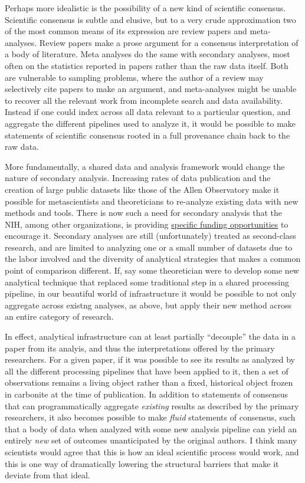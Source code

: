 \documentclass[11pt]{article}
\begin{document}
\begin{multicols}{2}
Perhaps more idealistic is the possibility of a new kind of scientific
consensus. Scientific consensus is subtle and elusive, but to a very
crude approximation two of the most common means of its expression are
review papers and meta-analyses. Review papers make a prose argument for
a consensus interpretation of a body of literature. Meta analyses do the
same with secondary analyses, most often on the statistics reported in
papers rather than the raw data itself. Both are vulnerable to sampling
problems, where the author of a review may selectively cite papers to
make an argument, and meta-analyses might be unable to recover all the
relevant work from incomplete search and data availability. Instead if
one could index across all data relevant to a particular question, and
aggregate the different pipelines used to analyze it, it would be
possible to make statements of scientific consensus rooted in a full
provenance chain back to the raw data.

More fundamentally, a shared data and analysis framework would change
the nature of secondary analysis. Increasing rates of data publication
and the creation of large public datasets like those of the Allen
Observatory make it possible for metascientists and theoreticians to
re-analyze existing data with new methods and tools. There is now such a
need for secondary analysis that the NIH, among other organizations, is
providing
\href{https://grants.nih.gov/grants/guide/rfa-files/rfa-mh-20-120.html}{specific
funding opportunities} to encourage it. Secondary analyses are still
(unfortunately) treated as second-class research, and are limited to
analyzing one or a small number of datasets due to the labor involved
and the diversity of analytical strategies that makes a common point of
comparison different. If, say some theoretician were to develop some new
analytical technique that replaced some traditional step in a shared
processing pipeline, in our beautiful world of infrastructure it would
be possible to not only aggregate across existng analyses, as above, but
apply their new method across an entire category of research.

In effect, analytical infrastructure can at least partially ``decouple''
the data in a paper from its analyis, and thus the interpretations
offered by the primary researchers. For a given paper, if it was
possible to see its results as analyzed by all the different processing
pipelines that have been applied to it, then a set of observations
remains a living object rather than a fixed, historical object frozen in
carbonite at the time of publication. In addition to statements of
consensus that can programmatically aggregate \emph{existing} results as
described by the primary researchers, it also becomes possible to make
\emph{fluid} statements of consensus, such that a body of data when
analyzed with some new analysis pipeline can yield an entirely
\emph{new} set of outcomes unanticipated by the original authors. I
think many scientists would agree that this is how an ideal scientific
process would work, and this is one way of dramatically lowering the
structural barriers that make it deviate from that ideal.


\end{multicols}
\end{document}

